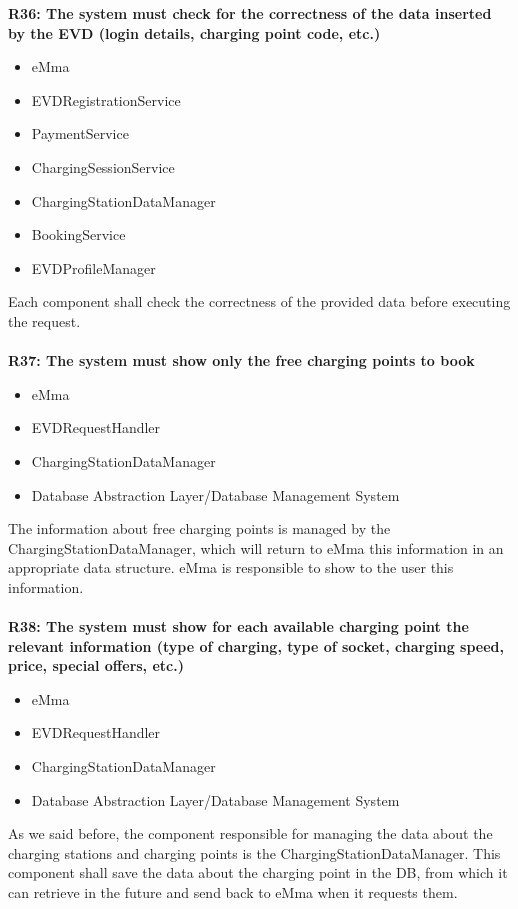 \textbf{R36: The system must check for the correctness of the data inserted by the
EVD (login details, charging point code, etc.)}
\begin{itemize}
	\item eMma
	\item EVDRegistrationService
	\item PaymentService
	\item ChargingSessionService
	\item ChargingStationDataManager
	\item BookingService
	\item EVDProfileManager
\end{itemize}
Each component shall check the correctness of the provided data before executing the request.\\
\\
\textbf{R37: The system must show only the free charging points to book}
\begin{itemize}
	\item eMma
	\item EVDRequestHandler
	\item ChargingStationDataManager
	\item Database Abstraction Layer/Database Management System
\end{itemize}
The information about free charging points is managed by the ChargingStationDataManager, which will return to eMma this information in an appropriate data structure. eMma is responsible to show to the user this information.\\
\\
\textbf{R38: The system must show for each available charging point the relevant
information (type of charging, type of socket, charging speed, price,
special offers, etc.)}
\begin{itemize}
	\item eMma
	\item EVDRequestHandler
	\item ChargingStationDataManager
	\item Database Abstraction Layer/Database Management System
\end{itemize}
As we said before, the component responsible for managing the data about the charging stations and charging points is the ChargingStationDataManager. This component shall save the data about the charging point in the DB, from which it can retrieve in the future and send back to eMma when it requests them.\\
\\
